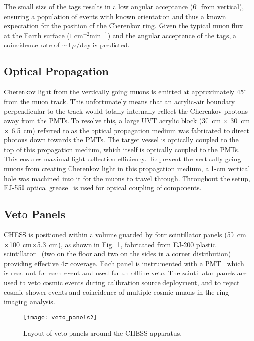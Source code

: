 The small size of the tags results in a low angular acceptance (6$^{\circ}$ from vertical), ensuring a population of events with known orientation and thus a known expectation for the position of the Cherenkov ring.  
Given the typical muon flux at the Earth surface ($1~\mbox{cm}^{-2}\mbox{min}^{-1}$) and the angular acceptance of the tags, a coincidence rate of $\sim4~\mu / \mbox{day}$ is predicted. 


\subsection{Optical Propagation}

Cherenkov light from the vertically going muons is emitted at approximately 45$^{\circ}$from the muon track.
This unfortunately means that an acrylic-air boundary perpendicular to the track would totally internally reflect the Cherenkov photons away from the PMTs.
To resolve this, a large UVT acrylic block (30~cm $\times$ 30~cm $\times$ 6.5~cm) referred to as the optical propagation medium was fabricated to direct photons down towards the PMTs.
The target vessel is optically coupled to the top of this propagation medium, which itself is optically coupled to the PMTs.
This ensures maximal light collection efficiency.
To prevent the vertically going muons from creating Cherenkov light in this propagation medium, a 1-cm vertical hole was machined into it for the muons to travel through.
Throughout the setup, EJ-550 optical grease~\cite{ej550} is used for optical coupling of components. 

\subsection{Veto Panels}\label{s:veto}

CHESS is positioned within a volume guarded by four scintillator panels (50~cm$\times$100~cm$\times$5.3~cm), as shown in Fig.~\ref{f:veto}, fabricated from EJ-200 plastic scintillator~\cite{ej200} (two on the floor and two on the sides in a corner distribution) providing effective $4\pi$ coverage. 
Each panel is instrumented with a PMT~\cite{9102ksb} which is read out for each event and used for an offline veto. The scintillator panels are used to veto cosmic events during calibration source deployment, and to reject cosmic shower events and coincidence of multiple cosmic muons in the ring imaging analysis. 

\begin{figure}
\centering
\texttt{[image: veto\_panels2]}
\caption{Layout of veto panels around the CHESS apparatus. }
\label{f:veto}
\end{figure}


